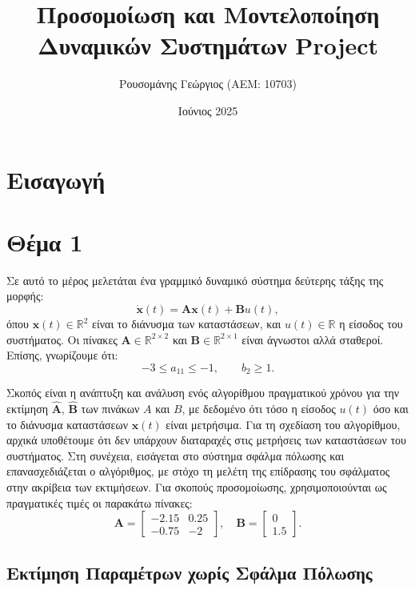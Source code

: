 \documentclass[a4paper,12pt]{article}
\title{Προσομοίωση και Μοντελοποίηση \newline Δυναμικών Συστημάτων \newline 
\selectlanguage{english}Project\selectlanguage{greek}}
\author{Ρουσομάνης Γεώργιος (ΑΕΜ: 10703)}
\date{Ιούνιος 2025}
\begin{document}
\maketitle

\section*{Εισαγωγή}

\section*{Θέμα 1}

Σε αυτό το μέρος μελετάται ένα γραμμικό δυναμικό σύστημα δεύτερης τάξης της μορφής:
\begin{equation}
\dot{\mathbf{x}}(t) = \mathbf{A} \mathbf{x}(t) + \mathbf{B} u(t),
\label{eq:state_space_form}
\end{equation}
όπου $\mathbf{x}(t) \in \mathbb{R}^2$ είναι το διάνυσμα των καταστάσεων, και $u(t) \in \mathbb{R}$ 
η είσοδος του συστήματος. Οι πίνακες $\mathbf{A} \in \mathbb{R}^{2 \times 2}$ και 
$\mathbf{B} \in \mathbb{R}^{2 \times 1}$ είναι άγνωστοι αλλά σταθεροί. Επίσης, γνωρίζουμε ότι:
\begin{equation}
-3 \leq a_{11} \leq -1, \quad \quad b_2 \geq 1.
\label{eq:restrictions}
\end{equation}

Σκοπός είναι η ανάπτυξη και ανάλυση ενός αλγορίθμου πραγματικού χρόνου για την εκτίμηση  
$\hat{\mathbf{A}},\,\hat{\mathbf{B}}$ των πινάκων $A$ και $B$, με δεδομένο ότι τόσο η είσοδος 
$u(t)$ όσο και το διάνυσμα καταστάσεων $\mathbf{x}(t)$ είναι μετρήσιμα. Για τη σχεδίαση του 
αλγορίθμου, αρχικά υποθέτουμε ότι δεν υπάρχουν διαταραχές στις μετρήσεις των καταστάσεων του 
συστήματος. Στη συνέχεια, εισάγεται στο σύστημα σφάλμα πόλωσης και επανασχεδιάζεται ο αλγόριθμος, 
με στόχο τη μελέτη της επίδρασης του σφάλματος στην ακρίβεια των εκτιμήσεων. Για σκοπούς 
προσομοίωσης, χρησιμοποιούνται ως πραγματικές τιμές οι παρακάτω πίνακες:
\[
\mathbf{A} = 
\begin{bmatrix}
-2.15 & 0.25 \\
-0.75 & -2
\end{bmatrix}, \quad
\mathbf{B} = 
\begin{bmatrix}
0 \\
1.5
\end{bmatrix}.
\]

\subsection*{Εκτίμηση Παραμέτρων χωρίς Σφάλμα Πόλωσης}
\end{document}
